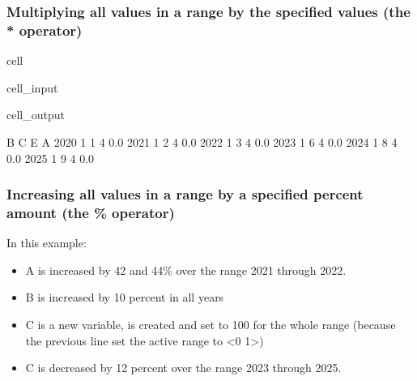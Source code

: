 \documentclass[letterpaper,10pt,english]{jupyterBook}
\begin{document}
\subsubsection{Multiplying all values in a range by the specified values (the * operator)}
\label{\detokenize{content/04_PythonEssentials/UpdateCommand:multiplying-all-values-in-a-range-by-the-specified-values-the-operator}}
\begin{sphinxuseclass}{cell}\begin{sphinxVerbatimInput}

\begin{sphinxuseclass}{cell_input}
\begin{sphinxVerbatim}[commandchars=\\\{\}]
\end{sphinxVerbatim}

\end{sphinxuseclass}\end{sphinxVerbatimInput}
\begin{sphinxVerbatimOutput}

\begin{sphinxuseclass}{cell_output}
\begin{sphinxVerbatim}[commandchars=\\\{\}]
      B  C  E    A
2020  1  1  4  0.0
2021  1  2  4  0.0
2022  1  3  4  0.0
2023  1  6  4  0.0
2024  1  8  4  0.0
2025  1  9  4  0.0
\end{sphinxVerbatim}

\end{sphinxuseclass}\end{sphinxVerbatimOutput}

\end{sphinxuseclass}

\subsubsection{Increasing all  values in a range by a  specified percent amount (the \% operator)}
\label{\detokenize{content/04_PythonEssentials/UpdateCommand:increasing-all-values-in-a-range-by-a-specified-percent-amount-the-operator}}
\sphinxAtStartPar
In this example:
\begin{itemize}
\item {} 
\sphinxAtStartPar
A is increased by 42 and 44\% over the range 2021 through 2022.

\item {} 
\sphinxAtStartPar
B is increased by 10 percent in all years

\item {} 
\sphinxAtStartPar
C is a new variable, is created and set to 100 for the whole range (because the previous line set the active range to  <\sphinxhyphen{}0 \sphinxhyphen{}1>)

\item {} 
\sphinxAtStartPar
C is decreased by 12 percent over the range 2023 through 2025.

\end{itemize}
\end{document}
